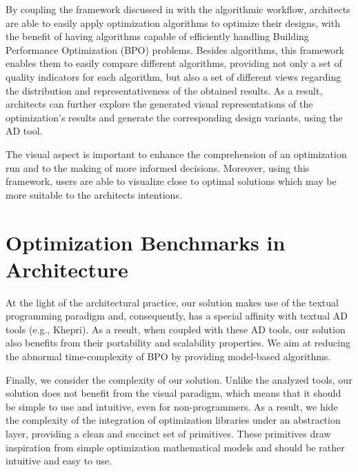 By coupling the framework discussed in  with the algorithmic workflow, architects are able to easily apply optimization algorithms to optimize their designs, with the benefit of having algorithms capable of efficiently handling Building Performance Optimization (\ac{BPO}) problems. Besides algorithms, this framework enables them to easily compare different algorithms, providing not only a set of quality indicators for each algorithm, but also a set of different views regarding the distribution and representativeness of the obtained results. As a result, architects can further explore the generated visual representations of the optimization's results and generate the corresponding design variants, using the \ac{AD} tool. 

The visual aspect is important to enhance the comprehension of an optimization run and to the making of more informed decisions. Moreover, using this framework, users are able to visualize close to optimal solutions which may be more suitable to the architects intentions. 


\section{Optimization Benchmarks in Architecture}



At the light of the architectural practice, our solution makes use of the textual programming paradigm and, consequently, has a special affinity with textual \ac{AD} tools (e.g., Khepri). As a result, when coupled with these \ac{AD} tools, our solution also benefits from their portability and scalability properties. We aim at reducing the abnormal time-complexity of \ac{BPO} by providing model-based algorithms. 

Finally, we consider the complexity of our solution. Unlike the analyzed tools, our solution does not benefit from the visual paradigm, which means that it should be simple to use and intuitive, even for non-programmers. As a result, we hide the complexity of the integration of optimization libraries under an abstraction layer, providing a clean and succinct set of primitives. These primitives draw inspiration from simple optimization mathematical models and should be rather intuitive and easy to use. 



